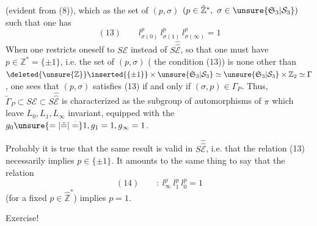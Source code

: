 (evident from (8)), which  as the set of $(p,\sigma)$ $(p\in\hat{\mathbb Z}^*,\ \sigma\in\unsure{\mathfrak S_3|\mathcal S_3})$ such that one has
\[
(13)\qquad l_{\sigma(0)}^p\ l_{\sigma(1)}^p\ l_{\sigma(\infty)}^p=1
\]
When one restricts oneself to $S\mathcal E$ instead of $S\widehat{\widehat{\mathcal E}}$, so that one must have $p\in\mathbb Z^*=\{\pm1\}$,  i.e. the set of $(p,\sigma)$ ( the condition (13)) is none other than $\deleted{\unsure{\mathbb Z}}\inserted{\{\pm1\}}\times\unsure{\mathfrak S_3|\mathcal S_3}\simeq\unsure{\mathfrak S_3|\mathcal S_3}\times\mathbb Z_2\simeq\Gamma$, one sees that $(p,\sigma)$ satisfies (13) if and only if $(\sigma,p)\in\Gamma_P$. Thus, $\tilde\Gamma_P\subset S\mathcal E\subset S\widehat{\widehat{\mathcal E}}$ is characterized as the subgroup  of automorphisms of $\pi$  which leave $L_0,L_1,L_\infty$ invariant, equipped with the  $g_0\unsure{=|\hat{=}|\overset{\cdot}{=}}1,g_1=1,g_\infty=1$.

Probably it is true that the same result is valid in $S\widehat{\widehat{\mathcal E}}$, i.e. that the relation (13) necessarily implies $p\in\{\pm1\}$. It amounts to the same thing to say  that the relation
\[
(14)\qquad :\ l_\infty^p\ l_1^p\ l_0^p=1
\]
(for a fixed $p\in\hat{\mathbb Z}^*$) implies $p=1$.

Exercise!
